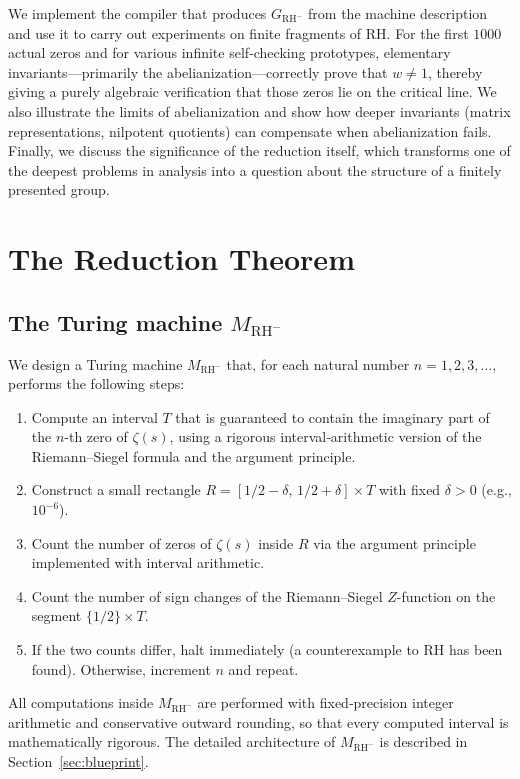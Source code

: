 \documentclass[11pt,a4paper]{article}
\begin{document}
We implement the compiler that produces \(G_{\text{RH}^-}\) from the machine description and use it to carry out experiments on finite fragments of RH. For the first $1000$ actual zeros and for various infinite self‑checking prototypes, elementary invariants—primarily the abelianization—correctly prove that \(w \neq 1\), thereby giving a purely algebraic verification that those zeros lie on the critical line. We also illustrate the limits of abelianization and show how deeper invariants (matrix representations, nilpotent quotients) can compensate when abelianization fails. Finally, we discuss the significance of the reduction itself, which transforms one of the deepest problems in analysis into a question about the structure of a finitely presented group.

\section{The Reduction Theorem}

\subsection{The Turing machine \(M_{\text{RH}^-}\)}
We design a Turing machine \(M_{\text{RH}^-}\) that, for each natural number \(n = 1,2,3,\dots\), performs the following steps:
\begin{enumerate}[leftmargin=*]
    \item Compute an interval \(T\) that is guaranteed to contain the imaginary part of the $n$-th zero of \(\zeta(s)\), using a rigorous interval‑arithmetic version of the Riemann–Siegel formula and the argument principle.
    \item Construct a small rectangle \(R = [1/2-\delta,\, 1/2+\delta] \times T\) with fixed \(\delta > 0\) (e.g., \(10^{-6}\)).
    \item Count the number of zeros of \(\zeta(s)\) inside \(R\) via the argument principle implemented with interval arithmetic.
    \item Count the number of sign changes of the Riemann–Siegel \(Z\)-function on the segment \(\{1/2\} \times T\).
    \item If the two counts differ, halt immediately (a counterexample to RH has been found). Otherwise, increment $n$ and repeat.
\end{enumerate}
All computations inside \(M_{\text{RH}^-}\) are performed with fixed‑precision integer arithmetic and conservative outward rounding, so that every computed interval is mathematically rigorous. The detailed architecture of \(M_{\text{RH}^-}\) is described in Section~\ref{sec:blueprint}.
\end{document}
